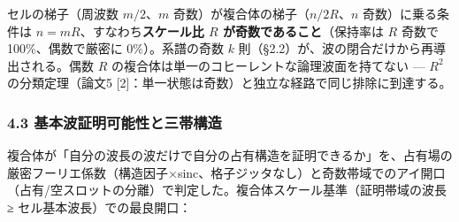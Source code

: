 \documentclass[
]{ltjsarticle}
\begin{document}
セルの梯子（周波数 \(m/2\)、\(m\) 奇数）が複合体の梯子（\(n/2R\)、\(n\)
奇数）に乗る条件は \(n=mR\)、すなわち\textbf{スケール比 \(R\)
が奇数であること}（保持率は \(R\) 奇数で 100\%、偶数で厳密に
0\%）。系譜の奇数 \(k\) 則（§2.2）が、波の閉合だけから再導出される。偶数
\(R\) の複合体は単一のコヒーレントな論理波面を持てない --- \(R^2\)
の分類定理（論文5
{[}2{]}：単一状態は奇数）と独立な経路で同じ排除に到達する。

\subsubsection{4.3
基本波証明可能性と三帯構造}\label{ux57faux672cux6ce2ux8a3cux660eux53efux80fdux6027ux3068ux4e09ux5e2fux69cbux9020}

複合体が「自分の波長の波だけで自分の占有構造を証明できるか」を、占有場の厳密フーリエ係数（構造因子×sinc、格子ジッタなし）と奇数帯域でのアイ開口（占有/空スロットの分離）で判定した。複合体スケール基準（証明帯域の波長
≥ セル基本波長）での最良開口：
\end{document}
